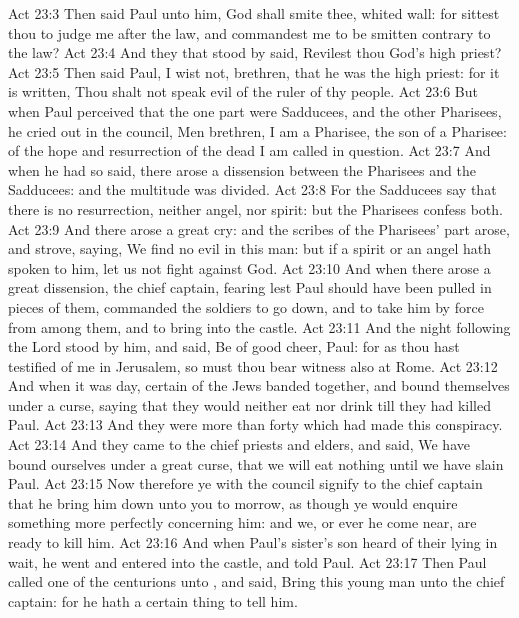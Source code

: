 \vs Act 23:3 Then said Paul unto him, God shall smite thee,  whited wall: for sittest thou to judge me after the law, and commandest me to be smitten contrary to the law?
\vs Act 23:4 And they that stood by said, Revilest thou God's high priest?
\vs Act 23:5 Then said Paul, I wist not, brethren, that he was the high priest: for it is written, Thou shalt not speak evil of the ruler of thy people.
\vs Act 23:6 But when Paul perceived that the one part were Sadducees, and the other Pharisees, he cried out in the council, Men  brethren, I am a Pharisee, the son of a Pharisee: of the hope and resurrection of the dead I am called in question.
\vs Act 23:7 And when he had so said, there arose a dissension between the Pharisees and the Sadducees: and the multitude was divided.
\vs Act 23:8 For the Sadducees say that there is no resurrection, neither angel, nor spirit: but the Pharisees confess both.
\vs Act 23:9 And there arose a great cry: and the scribes  of the Pharisees' part arose, and strove, saying, We find no evil in this man: but if a spirit or an angel hath spoken to him, let us not fight against God.
\vs Act 23:10 And when there arose a great dissension, the chief captain, fearing lest Paul should have been pulled in pieces of them, commanded the soldiers to go down, and to take him by force from among them, and to bring  into the castle.
\vs Act 23:11 And the night following the Lord stood by him, and said, Be of good cheer, Paul: for as thou hast testified of me in Jerusalem, so must thou bear witness also at Rome.
\vs Act 23:12 And when it was day, certain of the Jews banded together, and bound themselves under a curse, saying that they would neither eat nor drink till they had killed Paul.
\vs Act 23:13 And they were more than forty which had made this conspiracy.
\vs Act 23:14 And they came to the chief priests and elders, and said, We have bound ourselves under a great curse, that we will eat nothing until we have slain Paul.
\vs Act 23:15 Now therefore ye with the council signify to the chief captain that he bring him down unto you to morrow, as though ye would enquire something more perfectly concerning him: and we, or ever he come near, are ready to kill him.
\vs Act 23:16 And when Paul's sister's son heard of their lying in wait, he went and entered into the castle, and told Paul.
\vs Act 23:17 Then Paul called one of the centurions unto , and said, Bring this young man unto the chief captain: for he hath a certain thing to tell him.
